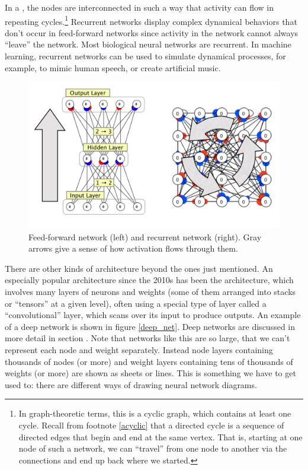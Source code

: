 In a , the nodes are interconnected in such a way that activity can flow in repeating cycles.\footnote{In graph-theoretic terms, this is a cyclic graph, which contains at least one cycle. Recall from footnote \ref{acyclic} that a directed cycle is a sequence of directed edges that begin and end at the same vertex. That is, starting at one node of such a network, we can ``travel'' from one node to another via the connections and end up back where we started. }   Recurrent networks display complex dynamical behaviors that don't occur in feed-forward networks since activity in the network cannot always ``leave'' the network. Most biological neural networks are recurrent. In machine learning, recurrent networks can be used to simulate dynamical processes, for example,  to mimic human speech, or create artificial music.

\begin{figure}[h]
\centering
\includegraphics[scale=.7]{./images/NeuralNetTypes.png}
\caption[Simbrain screenshots with additional elements added by Pamela Payne.]{Feed-forward network (left) and recurrent network (right). Gray arrows give a sense of how activation flows through them.}
\label{nn_types}
\end{figure}

There are other kinds of architecture beyond the ones just mentioned. An especially popular architecture since the 2010s has been the  architecture, which involves many layers of neurons and weights (some of them arranged into stacks or ``tensors'' at a given level), often using a special type of layer called a ``convolutional'' layer, which scans over its input to produce outputs. An example of a deep network is shown in figure \ref{deep_net}. Deep networks are discussed in more detail in section . Note that networks like this are so large, that we can't represent each node and weight separately. Instead node layers containing thousands of nodes (or more) and weight layers containing tens of thousands  of weights (or more)  are shown as sheets or lines. This is something we have to get used to: there are different ways of drawing neural network diagrams. 

